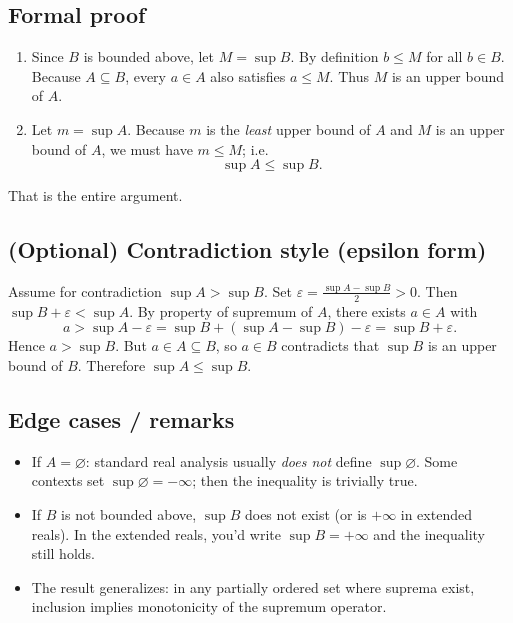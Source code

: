 \documentclass[12pt,a4paper]{article}
\theoremstyle{definition}
\theoremstyle{remark}
\begin{document}
\subsection*{Formal proof}

\begin{enumerate}
    \item Since \(B\) is bounded above, let \(M=\sup B\). By definition \(b\le M\) for all \(b\in B\).  
       Because \(A\subseteq B\), every \(a\in A\) also satisfies \(a\le M\). Thus \(M\) is an upper bound of \(A\).

    \item Let \(m=\sup A\). Because \(m\) is the \emph{least} upper bound of \(A\) and \(M\) is an upper bound of \(A\), we must have \(m\le M\); i.e.
       \[
       \sup A \le \sup B.
       \]
\end{enumerate}

That is the entire argument.



\subsection*{(Optional) Contradiction style (epsilon form)}

Assume for contradiction \(\sup A > \sup B\). Set \(\varepsilon = \frac{\sup A - \sup B}{2} >0\). Then \(\sup B + \varepsilon < \sup A\). By property of supremum of \(A\), there exists \(a\in A\) with
\[
a > \sup A - \varepsilon = \sup B + (\sup A - \sup B) - \varepsilon = \sup B + \varepsilon.
\]
Hence \(a > \sup B\). But \(a\in A\subseteq B\), so \(a\in B\) contradicts that \(\sup B\) is an upper bound of \(B\). Therefore \(\sup A \le \sup B\).



\subsection*{Edge cases / remarks}

\begin{itemize}
    \item If \(A=\varnothing\): standard real analysis usually \emph{does not} define \(\sup\varnothing\). Some contexts set \(\sup\varnothing=-\infty\); then the inequality is trivially true.
    \item If \(B\) is not bounded above, \(\sup B\) does not exist (or is \(+\infty\) in extended reals). In the extended reals, you’d write \(\sup B=+\infty\) and the inequality still holds.
    \item The result generalizes: in any partially ordered set where suprema exist, inclusion implies monotonicity of the supremum operator.
\end{itemize}
\end{document}
